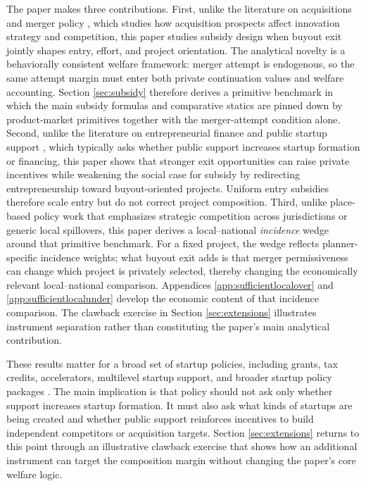 The paper makes three contributions. First, unlike the literature on acquisitions and merger policy \citep{cunningham2021killer,letina2024killer,dijk2024direction,dijk2025strategic}, which studies how acquisition prospects affect innovation strategy and competition, this paper studies subsidy design when buyout exit jointly shapes entry, effort, and project orientation. The analytical novelty is a behaviorally consistent welfare framework: merger attempt is endogenous, so the same attempt margin must enter both private continuation values and welfare accounting. Section \ref{sec:subsidy} therefore derives a primitive benchmark in which the main subsidy formulas and comparative statics are pinned down by product-market primitives together with the merger-attempt condition alone. Second, unlike the literature on entrepreneurial finance and public startup support \citep{lerner2020vcrole,lerner2022governmentincentives,bai2021public}, which typically asks whether public support increases startup formation or financing, this paper shows that stronger exit opportunities can raise private incentives while weakening the social case for subsidy by redirecting entrepreneurship toward buyout-oriented projects. Uniform entry subsidies therefore scale entry but do not correct project composition. Third, unlike place-based policy work that emphasizes strategic competition across jurisdictions or generic local spillovers, this paper derives a local--national \emph{incidence} wedge around that primitive benchmark. For a fixed project, the wedge reflects planner-specific incidence weights; what buyout exit adds is that merger permissiveness can change which project is privately selected, thereby changing the economically relevant local--national comparison. Appendices \ref{app:sufficientlocalover} and \ref{app:sufficientlocalunder} develop the economic content of that incidence comparison. The clawback exercise in Section \ref{sec:extensions} illustrates instrument separation rather than constituting the paper's main analytical contribution.

These results matter for a broad set of startup policies, including grants, tax credits, accelerators, multilevel startup support, and broader startup policy packages \citep{fazio2020rdtax,denes2023investortax,gonzalezuribe2018accelerators,manaresi2021startupact,lanahan2015multilevel}. The main implication is that policy should not ask only whether support increases startup formation. It must also ask what kinds of startups are being created and whether public support reinforces incentives to build independent competitors or acquisition targets. Section \ref{sec:extensions} returns to this point through an illustrative clawback exercise that shows how an additional instrument can target the composition margin without changing the paper's core welfare logic.

